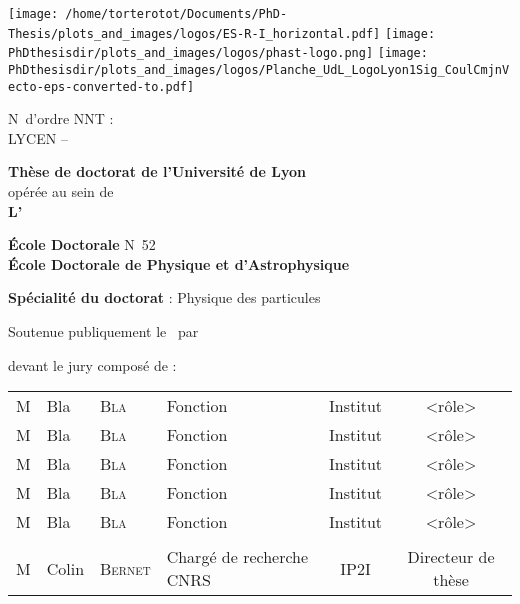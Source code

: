 \thispagestyle{empty}
\begin{center}
\large

\texttt{[image: /home/torterotot/Documents/PhD-Thesis/plots\_and\_images/logos/ES-R-I\_horizontal.pdf]}
\hfill
\texttt{[image: \\PhDthesisdir/plots\_and\_images/logos/phast-logo.png]}
\hfill
\texttt{[image: \\PhDthesisdir/plots\_and\_images/logos/Planche\_UdL\_LogoLyon1Sig\_CoulCmjnVecto-eps-converted-to.pdf]}

\begin{flushleft}
N\degree\ d'ordre NNT : \\
LYCEN -- 
\end{flushleft}

\vspace{5mm}

{\LARGE \textbf{Thèse de doctorat de l'Université de Lyon}}\\
opérée au sein de\\
\textbf{L'\insertinstitute}

\vspace{.75cm}

\textbf{École Doctorale} N\degree\ 52\\
\textbf{École Doctorale de Physique et d'Astrophysique}

\vspace{.75cm}

\textbf{Spécialité du doctorat} : Physique des particules

\vspace{1.25cm}

Soutenue publiquement le \insertdate\ par

\vspace{.75cm}

{\LARGE \textbf{\insertauthor}}

\vspace{1.25cm}

\textbf{\huge\inserttitle}

\vfill
devant le jury composé de :

\vspace{.25cm}

\begin{tabular}{llllcc}
M & Bla & \textsc{Bla} & Fonction & Institut & <rôle>\\
M & Bla & \textsc{Bla} & Fonction & Institut & <rôle>\\
M & Bla & \textsc{Bla} & Fonction & Institut & <rôle>\\
M & Bla & \textsc{Bla} & Fonction & Institut & <rôle>\\
M & Bla & \textsc{Bla} & Fonction & Institut & <rôle>\\
\\
M & Colin & \textsc{Bernet} & Chargé de recherche CNRS & IP2I & Directeur de thèse\\
\end{tabular}


\end{center}
